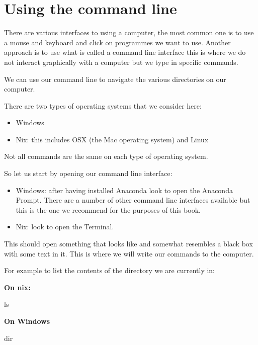 \section{Using the command line}\label{sec:using-the-command-line}

There are various interfaces to using a computer, the most common one is to use
a mouse and keyboard and click on programmes we want to use. Another approach is
to use what is called a command line interface this is where we do not interact
graphically with a computer but we type in specific commands.


We can use our command line to navigate the various directories on our
computer.

There are two types of operating systems that we consider here:

\begin{itemize}
    \item Windows
    \item Nix: this includes OSX (the Mac operating system) and Linux
\end{itemize}

Not all commands are the same on each type of operating system.

So let us start by opening our command line interface:

\begin{itemize}
    \item Windows: after having installed Anaconda look to open the
        Anaconda Prompt. There are a number of other command line interfaces
        available but this is the one we recommend for the purposes of this
        book.
    \item Nix: look to open the Terminal.
\end{itemize}

This should open something that looks like %
and somewhat resembles a black box with some text in it.
This is where we will write our commands to the computer.

For example to list the contents of the directory we are currently in:

\textbf{On nix:}

\begin{cliin}
ls
\end{cliin}

\textbf{On Windows}

\begin{cliin}
dir
\end{cliin}

